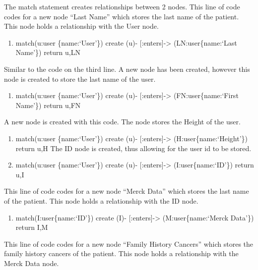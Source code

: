 \documentclass[]{book}
\providecommand{\tightlist}{%
  \setlength{\itemsep}{0pt}\setlength{\parskip}{0pt}}
\begin{document}
The match statement creates relationships between 2 nodes. This line of code codes for a new node ``Last Name'' which stores the last name of the patient. This node holds a relationship with the User node.

\begin{enumerate}
\def\labelenumi{\arabic{enumi}.}
\setcounter{enumi}{2}
\tightlist
\item
  match(u:user \{name:`User'\}) create (u)- {[}:enters{]}-\textgreater{} (LN:user\{name:`Last Name'\}) return u,LN
\end{enumerate}

Similar to the code on the third line. A new node has been created, however this node is created to store the last name of the user.

\begin{enumerate}
\def\labelenumi{\arabic{enumi}.}
\setcounter{enumi}{3}
\tightlist
\item
  match(u:user \{name:`User'\}) create (u)- {[}:enters{]}-\textgreater{} (FN:user\{name:`First Name'\}) return u,FN
\end{enumerate}

A new node is created with this code. The node stores the Height of the user.

\begin{enumerate}
\def\labelenumi{\arabic{enumi}.}
\setcounter{enumi}{4}
\item
  match(u:user \{name:`User'\}) create (u)- {[}:enters{]}-\textgreater{} (H:user\{name:`Height'\}) return u,H
  The ID node is created, thus allowing for the user id to be stored.
\item
  match(u:user \{name:`User'\}) create (u)- {[}:enters{]}-\textgreater{} (I:user\{name:`ID'\}) return u,I
\end{enumerate}

This line of code codes for a new node ``Merck Data'' which stores the last name of the patient. This node holds a relationship with the ID node.

\begin{enumerate}
\def\labelenumi{\arabic{enumi}.}
\setcounter{enumi}{6}
\tightlist
\item
  match(I:user\{name:`ID'\}) create (I)- {[}:enters{]}-\textgreater{} (M:user\{name:`Merck Data'\}) return I,M
\end{enumerate}

This line of code codes for a new node ``Family History Cancers'' which stores the family history cancers of the patient. This node holds a relationship with the Merck Data node.
\end{document}
